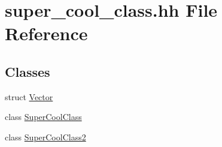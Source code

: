 \hypertarget{super__cool__class_8hh}{}\section{super\+\_\+cool\+\_\+class.\+hh File Reference}
\label{super__cool__class_8hh}
\subsection*{Classes}
\begin{DoxyCompactItemize}
\item 
struct \hyperlink{struct_vector}{Vector}
\item 
class \hyperlink{class_super_cool_class}{Super\+Cool\+Class}
\item 
class \hyperlink{class_super_cool_class2}{Super\+Cool\+Class2}
\end{DoxyCompactItemize}
